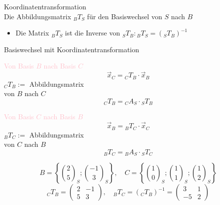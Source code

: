 \begin{concept}{Koordinatentransformation}\\
    Die Abbildungsmatrix ${ }_{B} T_{S}$ für den Basiswechsel von $S$ nach $B$
    \begin{itemize}
    \item Die Matrix ${ }_{B} T_{S}$ ist die Inverse von ${ }_{S} T_{B}:{ }_{B} T_{S}=\left({ }_{S} T_{B}\right)^{-1}$
    \end{itemize}
    \begin{center}
    \end{center}
\end{concept}

\begin{KR}{Basiswechsel mit Koordinatentransformation}\\
    \begin{minipage}{0.45\linewidth}
        \textcolor{pink}{Von Basis $B$ nach Basis $C$}
        $$
        \vec{x}_{C}={ }_{C} T_{B} \cdot \vec{x}_{B}
        $$
        ${ }_{C} T_{B} :=$ Abbildungsmatrix\\ von $B$ nach $C$
        $${ }_{C} T_{B} = { }_{C} A_{S} \cdot { }_{S} T_{B}$$
    \end{minipage}
    \hspace{3mm}
    \begin{minipage}{0.45\linewidth}
        \textcolor{pink}{Von Basis $C$ nach Basis $B$}
        $$
        \vec{x}_{B}={ }_{B} T_{C} \cdot \vec{x}_{C}
        $$
        ${ }_{B} T_{C} :=$ Abbildungsmatrix\\ von $C$ nach $B$
        $${ }_{B} T_{C} = { }_{B} A_{S} \cdot { }_{S} T_{C}$$
    \end{minipage}
\end{KR}

\begin{example}
    $$
    B=\left\{\binom{2}{5}_{S} ;\binom{-1}{3}_{S}\right\}, \quad C=\left\{\binom{1}{0}_{S} ;\binom{1}{1}_{S} ;\binom{1}{2}_{S}\right\}
    $$
    $$
    { }_{C} T_{B}=\left(\begin{array}{cc}
    2 & -1 \\
    5 & 3
    \end{array}\right), \quad { }_{B} T_{C}=\left({ }_{C} T_{B}\right)^{-1}=\left(\begin{array}{cc}
    3 & 1 \\
    -5 & 2
    \end{array}\right)
    $$
\end{example}

